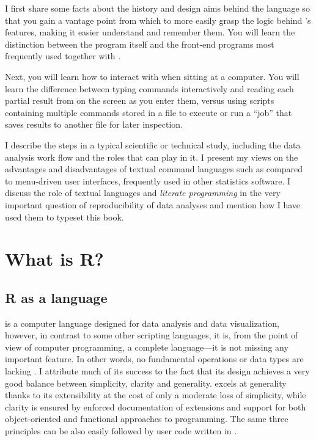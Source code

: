 \documentclass[krantz2]{krantz}\usepackage{knitr}
\begin{document}
I first share some facts about the history and design aims behind the \Rlang language so that you gain a vantage point from which to more easily grasp the logic behind \Rlang's features, making it easier understand and remember them. You will learn the distinction between the \Rpgrm program itself and the front-end programs most frequently used together with \Rpgrm.

Next, you will learn how to interact with \Rpgrm when sitting at a computer. You will learn the difference between typing commands interactively and reading each partial result from \Rlang on the screen as you enter them, versus using \Rlang scripts containing multiple commands stored in a file to execute or run a ``job'' that saves results to another file for later inspection.

I describe the steps in a typical scientific or technical study, including the data analysis work flow and the roles that \Rpgrm can play in it. I present my views on the advantages and disadvantages of textual command languages such as \Rlang compared to menu-driven user interfaces, frequently used in other statistics software. I discuss the role of textual languages and \emph{literate programming} in the very important question of reproducibility of data analyses and mention how I have used them to typeset this book.

\section{What is R?}

\subsection{R as a language}
\Rlang is a computer language designed for data analysis and data visualization, however, in contrast to some other scripting languages, it is, from the point of view of computer programming, a complete language---it is not missing any important feature. In other words, no fundamental operations or data types are lacking \autocite{Chambers2016}. I attribute much of its success to the fact that its design achieves a very good balance between simplicity, clarity and generality. \Rlang excels at generality thanks to its extensibility at the cost of only a moderate loss of simplicity, while clarity is ensured by enforced documentation of extensions and support for both object-oriented and functional approaches to programming. The same three principles can be also easily followed by user code written in \Rlang.
\end{document}

